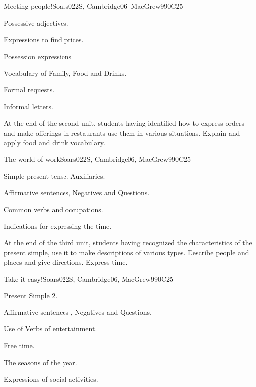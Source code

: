 \begin{syllabus}
\begin{unit}{Meeting people!}{}{Soars022S, Cambridge06, MacGrew99}{0}{C25}
   \begin{topics}
      \item Possessive adjectives.
      \item Expressions to find prices.
      \item Possession expressions
      \item Vocabulary of Family, Food and Drinks.
      \item Formal requests.
      \item Informal letters.
   \end{topics}

   \begin{learningoutcomes}
      \item At the end of the second unit, students having identified how to express orders and make offerings in restaurants use them in various situations. Explain and apply food and drink vocabulary.
   \end{learningoutcomes}

\end{unit}

\begin{unit}{The world of work}{}{Soars022S, Cambridge06, MacGrew99}{0}{C25}
   \begin{topics}
      \item Simple present tense. Auxiliaries.
      \item Affirmative sentences, Negatives and Questions.
      \item Common verbs and occupations.
      \item Indications for expressing the time.
   \end{topics}

   \begin{learningoutcomes}
      \item At the end of the third unit, students having recognized the characteristics of the present simple, use it to make descriptions of various types. Describe people and places and give directions. Express time.
   \end{learningoutcomes}

\end{unit}

\begin{unit}{Take it easy!}{}{Soars022S, Cambridge06, MacGrew99}{0}{C25}
   \begin{topics}
      \item Present Simple 2.
      \item Affirmative sentences , Negatives and Questions.
      \item Use of Verbs of entertainment.
      \item Free time.
      \item The seasons of the year.
      \item Expressions of social activities.
   \end{topics}


\end{unit}
\end{syllabus}
